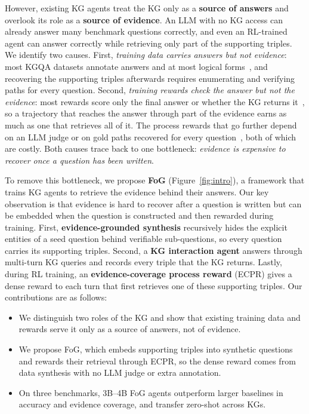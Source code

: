 However, existing KG agents treat the KG only as a \textbf{source of answers} and overlook its role as a \textbf{source of evidence}. An LLM with no KG access can already answer many benchmark questions correctly, and even an RL-trained agent can answer correctly while retrieving only part of the supporting triples. We identify two causes. First, \emph{training data carries answers but not evidence}: most KGQA datasets annotate answers and at most logical forms~\cite{cwq,webqsp,grailqa}, and recovering the supporting triples afterwards requires enumerating and verifying paths for every question. Second, \emph{training rewards check the answer but not the evidence}: most rewards score only the final answer or whether the KG returns it~\cite{KG-R1,Plan-Then-retrieve,GraphWalker,KnowCoder-A1,KBQA-R1}, so a trajectory that reaches the answer through part of the evidence earns as much as one that retrieves all of it. The process rewards that go further depend on an LLM judge or on gold paths recovered for every question~\cite{KG-Hopper,EoG}, both of which are costly. Both causes trace back to one bottleneck: \emph{evidence is expensive to recover once a question has been written}.

To remove this bottleneck, we propose \textbf{FoG} (Figure~\ref{fig:intro}), a framework that trains KG agents to retrieve the evidence behind their answers. Our key observation is that evidence is hard to recover after a question is written but can be embedded when the question is constructed and then rewarded during training. First, \textbf{evidence-grounded synthesis} recursively hides the explicit entities of a seed question behind verifiable sub-questions, so every question carries its supporting triples. Second, a \textbf{KG interaction agent} answers through multi-turn KG queries and records every triple that the KG returns. Lastly, during RL training, an \textbf{evidence-coverage process reward} (ECPR) gives a dense reward to each turn that first retrieves one of these supporting triples. Our contributions are as follows:
\begin{itemize}[leftmargin=*,itemsep=0pt,topsep=2pt]
    \item We distinguish two roles of the KG and show that existing training data and rewards serve it only as a source of answers, not of evidence.
    \item We propose FoG, which embeds supporting triples into synthetic questions and rewards their retrieval through ECPR, so the dense reward comes from data synthesis with no LLM judge or extra annotation.
    \item On three benchmarks, 3B--4B FoG agents outperform larger baselines in accuracy and evidence coverage, and transfer zero-shot across KGs.
\end{itemize}
